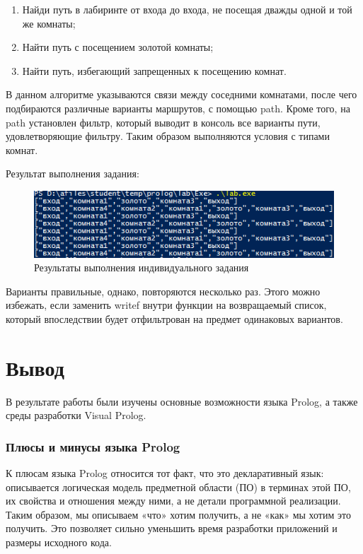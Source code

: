 \documentclass[14pt,a4paper,report]{report}
\begin{document}
\begin{enumerate}
	\item Найди путь в лабиринте от входа до входа, не посещая дважды одной и той же комнаты;
	\item Найти путь с посещением золотой комнаты;
	\item Найти путь, избегающий запрещенных к посещению комнат.
\end{enumerate}



В данном алгоритме указываются связи между соседними комнатами, после чего подбираются различные варианты маршрутов, с помощью path. Кроме того, на path установлен фильтр, который выводит в консоль все варианты пути, удовлетворяющие фильтру. Таким образом выполняются условия с типами комнат.

Результат выполнения задания:

\begin{figure}[h!]
	\centering
	\includegraphics[scale = 1.0]{images/i2.png}
	\caption{Результаты выполнения индивидуального задания}
\end{figure}

Варианты правильные, однако, повторяются несколько раз. Этого можно избежать, если заменить writef внутри функции на возвращаемый список, который впоследствии будет отфильтрован на предмет одинаковых вариантов.


\section{Вывод}

В результате работы были изучены основные возможности языка Prolog, а также среды разработки Visual Prolog.

\subsubsection{Плюсы и минусы языка Prolog}

К плюсам языка Prolog относится тот факт, что это декларативный язык: описывается логическая модель предметной области (ПО) в терминах этой ПО, их свойства и отношения между ними, а не детали программной реализации. Таким образом, мы описываем «что» хотим получить, а не «как» мы хотим это получить. Это позволяет сильно уменьшить время разработки приложений и размеры исходного кода.
\end{document}
